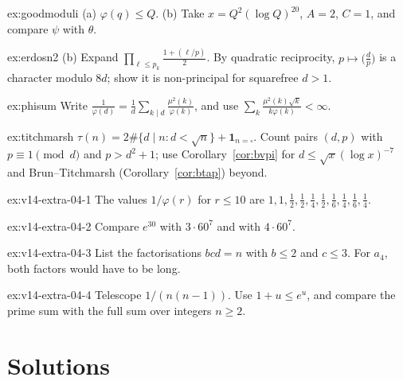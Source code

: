 \begin{hint}{ex:goodmoduli}
(a) $\varphi(q)\le Q$. (b) Take $x=Q^2(\log Q)^{20}$, $A=2$, $C=1$, and compare $\psi$ with $\theta$.
\end{hint}

\begin{hint}{ex:erdosn2}
(b) Expand $\prod_{\ell\le p_k}\frac{1+(\ell/p)}2$. By quadratic reciprocity, $p\mapsto\bigl(\frac dp\bigr)$ is a character modulo $8d$; show it is non-principal for squarefree $d>1$.
\end{hint}

\begin{hint}{ex:phisum}
Write $\frac1{\varphi(d)}=\frac1d\sum_{k\mid d}\frac{\mu^2(k)}{\varphi(k)}$, and use $\sum_k\frac{\mu^2(k)\sqrt k}{k\varphi(k)}<\infty$.
\end{hint}

\begin{hint}{ex:titchmarsh}
$\tau(n)=2\#\{d\mid n:d<\sqrt n\}+\mathbf 1_{n=\square}$. Count pairs $(d,p)$ with $p\equiv1\pmod d$ and $p>d^2+1$; use Corollary~\ref{cor:bvpi} for $d\le\sqrt x(\log x)^{-7}$ and Brun--Titchmarsh (Corollary~\ref{cor:btap}) beyond.
\end{hint}

\begin{hint}{ex:v14-extra-04-1}
The values $1/\varphi(r)$ for $r\le10$ are $1,1,\frac12,\frac12,\frac14,\frac12,\frac16,\frac14,\frac16,\frac14$.
\end{hint}

\begin{hint}{ex:v14-extra-04-2}
Compare $e^{30}$ with $3\cdot60^7$ and with $4\cdot60^7$.
\end{hint}

\begin{hint}{ex:v14-extra-04-3}
List the factorisations $bcd=n$ with $b\le2$ and $c\le3$. For $a_4$, both factors would have to be long.
\end{hint}

\begin{hint}{ex:v14-extra-04-4}
Telescope $1/(n(n-1))$. Use $1+u\le e^u$, and compare the prime sum with the full sum over integers $n\ge2$.
\end{hint}

\section{Solutions}

